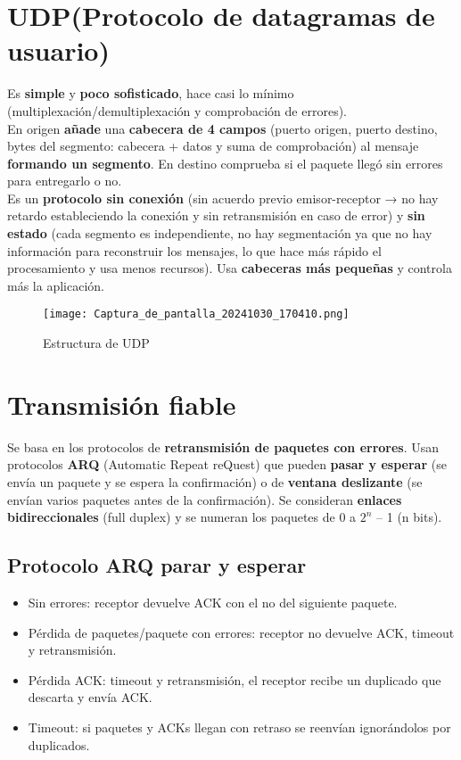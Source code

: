 \documentclass{article}
\begin{document}
\newpage

\section{UDP(Protocolo de datagramas de usuario)}
Es \textbf{simple} y \textbf{poco sofisticado}, hace casi lo mínimo (multiplexación/demultiplexación y comprobación de errores). \\

En origen \textbf{añade} una \textbf{cabecera de 4 campos} (puerto origen, puerto destino, bytes del segmento: cabecera + datos y suma de comprobación) al mensaje \textbf{formando un segmento}. En destino comprueba si el paquete llegó sin errores para entregarlo o no. \\

Es un \textbf{protocolo sin conexión} (sin acuerdo previo emisor-receptor → no hay retardo estableciendo la conexión y sin retransmisión en caso de error) y \textbf{sin estado} (cada segmento es independiente, no hay segmentación ya que no hay información para reconstruir los mensajes, lo que hace más rápido el procesamiento y usa menos recursos). Usa \textbf{cabeceras más pequeñas} y controla más la aplicación. \\
\begin{figure}[h]
    \centering
    \texttt{[image: Captura\_de\_pantalla\_20241030\_170410.png]} %
    \caption{Estructura de UDP}
    \label{fig:etiqueta}
\end{figure}

\section{Transmisión fiable}
Se basa en los protocolos de \textbf{retransmisión de paquetes con errores}. Usan protocolos \textbf{ARQ} (Automatic Repeat reQuest) que pueden \textbf{pasar y esperar} (se envía un paquete y se espera la confirmación) o de \textbf{ventana deslizante} (se envían varios paquetes antes de la confirmación). Se consideran \textbf{enlaces bidireccionales} (full duplex) y se numeran los paquetes de 0 a $2^n$ – 1 (n bits). \\

\newpage

\subsection{Protocolo ARQ parar y esperar} 
\begin{itemize}
    \item Sin errores: receptor devuelve ACK con el no del siguiente paquete.
    \item Pérdida de paquetes/paquete con errores: receptor no devuelve ACK, timeout y retransmisión.
    \item Pérdida ACK: timeout y retransmisión, el receptor recibe un duplicado que descarta y envía ACK.
    \item Timeout: si paquetes y ACKs llegan con retraso se reenvían ignorándolos por duplicados.
\end{itemize}
\end{document}
